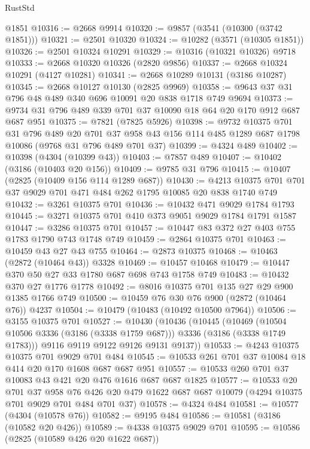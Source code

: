 \begin{lexlean}{RustStd}
\begin{coremodule}
{\begin{coremodule}
{{{{{{{{{{{{{{{{{{{{    @1851
@10316 := @2668 @9914
@10320 := @9857 (@3541 (@10300 (@3742 @1851)))
@10321 := @2501 @10320
@10324 := @10282 (@3571 (@10305 @1851))
@10326 := @2501 @10324 @10291
@10329 := @10316 (@10321 @10326) @9718
@10333 := @2668 @10320 @10326 (@2820 @9856)
@10337 := @2668 @10324 @10291 (@4127 @10281)
@10341 := @2668 @10289 @10131 (@3186 @10287)
@10345 := @2668 @10127 @10130 (@2825 @9969)
@10358 := @9643 @37 @31 @796 @48 @489 @340 @696 @10091 @20 @838 @1718 @749 @9694
@10373 := @9734 @31 @796 @489 @339 @701 @37 @10090 @18 @64 @20 @170 @912 @687 @687 @951
@10375 := @7821 (@7825 @5926)
@10398 := @9732
    @10375
    @701
    @31
    @796
    @489
    @20
    @701
    @37
    @958
    @43
    @156
    @114
    @485
    @1289
    @687
    @1798
    @10086
    (@9768 @31 @796 @489 @701 @37)
@10399 := @4324 @489
@10402 := @10398 (@4304 (@10399 @43))
@10403 := @7857 @489
@10407 := @10402 (@3186 (@10403 @20 @156))
@10409 := @9785 @31 @796
@10415 := @10407 (@2825 (@10409 @156 @114 @1289 @687))
@10430 := @4213 @10375 @701 @701 @37 @9029 @701 @471 @484 @262 @1795 @10085 @20 @838 @1740 @749
@10432 := @3261 @10375 @701
@10436 := @10432 @471 @9029 @1784 @1793
@10445 := @3271 @10375 @701 @410 @373 @9051 @9029 @1784 @1791 @1587
@10447 := @3286 @10375 @701
@10457 := @10447 @83 @372 @27 @403 @755 @1783 @1790 @743 @1748 @749
@10459 := @2864 @10375 @701
@10463 := @10459 @43 @27 @43 @755
@10464 := @2873 @10375
@10468 := @10463 (@2872 (@10464 @43)) @3328
@10469 := @10457 @10468
@10479 := @10447 @370 @50 @27 @33 @1780 @687 @698 @743 @1758 @749
@10483 := @10432 @370 @27 @1776 @1778
@10492 := @8016 @10375 @701 @135 @27 @29 @900 @1385 @1766 @749
@10500 := @10459 @76 @30 @76 @900 (@2872 (@10464 @76)) @4237
@10504 := @10479 (@10483 (@10492 @10500 @7964))
@10506 := @3155 @10375 @701
@10527 := @10430
    (@10436
      (@10445
        (@10469 (@10504 @10506 @3336 (@3186 (@3338 @1759 @687))) @3336 (@3186 (@3338 @1749 @1783)))
        @9116
        @9119
        @9122
        @9126
        @9131
        @9137))
@10533 := @4243 @10375 @10375 @701 @9029 @701 @484
@10545 := @10533 @261 @701 @37 @10084 @18 @414 @20 @170 @1608 @687 @687 @951
@10557 := @10533 @260 @701 @37 @10083 @43 @421 @20 @476 @1616 @687 @687 @1825
@10577 := @10533
    @20
    @701
    @37
    @958
    @76
    @426
    @20
    @479
    @1622
    @687
    @687
    @10079
    (@4294 @10375 @701 @9029 @701 @484 @701 @37)
@10578 := @4324 @484
@10581 := @10577 (@4304 (@10578 @76))
@10582 := @9195 @484
@10586 := @10581 (@3186 (@10582 @20 @426))
@10589 := @4338 @10375 @9029 @701
@10595 := @10586 (@2825 (@10589 @426 @20 @1622 @687))
}}}}}}}}}}}}}}}}}}}}
\end{coremodule}}
\end{coremodule}
\end{lexlean}
